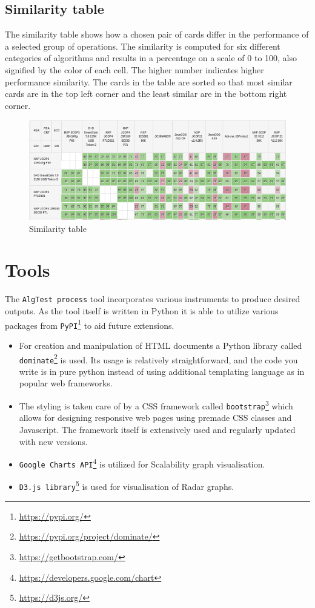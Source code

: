\subsection{Similarity table}
The similarity table shows how a chosen pair of cards differ in the performance of a selected group of operations. The similarity is computed for six different categories of algorithms and results in a percentage on a scale of 0 to 100, also signified by the color of each cell. The higher number indicates higher performance similarity. The cards in the table are sorted so that most similar cards are in the top left corner and the least similar are in the bottom right corner.

\begin{figure}[h]
    \centering
    \includegraphics[width=\textwidth]{img/similarity-table.png}
    \caption{Similarity table}
    \label{fig:similarity-table}
\end{figure}

\section{Tools}
The \texttt{AlgTest process} tool incorporates various instruments to produce desired outputs. As the tool itself is written in Python it is able to utilize various packages from \texttt{PyPI}\footnote{\url{https://pypi.org/}} to aid future extensions.

\begin{itemize}
    \item For creation and manipulation of HTML documents a Python library called \texttt{dominate}\footnote{\url{https://pypi.org/project/dominate/}} is used. Its usage is relatively straightforward, and the code you write is in pure python instead of using additional templating language as in popular web frameworks.
    \item The styling is taken care of by a CSS framework called \texttt{bootstrap}\footnote{\url{https://getbootstrap.com/}} which allows for designing responsive web pages using premade CSS classes and Javascript. The framework itself is extensively used and regularly updated with new versions.
    \item \texttt{Google Charts API}\footnote{\url{https://developers.google.com/chart}}  is utilized for Scalability graph visualisation.
    \item \texttt{D3.js library}\footnote{\url{https://d3js.org/}}  is used for visualisation of Radar graphs.
\end{itemize}

